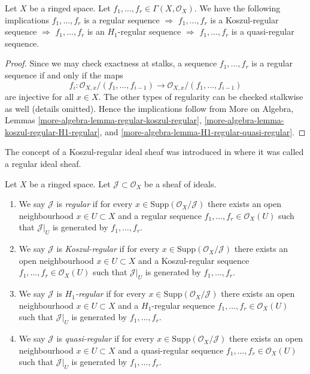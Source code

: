 \begin{lemma}
\label{lemma-types-regular-sequences-implications}
Let $X$ be a ringed space.
Let $f_1, \ldots, f_r \in \Gamma(X, \mathcal{O}_X)$.
We have the following implications
$f_1, \ldots, f_r$ is a regular sequence $\Rightarrow$
$f_1, \ldots, f_r$ is a Koszul-regular sequence $\Rightarrow$
$f_1, \ldots, f_r$ is an $H_1$-regular sequence $\Rightarrow$
$f_1, \ldots, f_r$ is a quasi-regular sequence.
\end{lemma}

\begin{proof}
Since we may check exactness at stalks, a
sequence $f_1, \ldots, f_r$ is a regular sequence if and only
if the maps
$$
f_i :
\mathcal{O}_{X, x}/(f_1, \ldots, f_{i - 1})
\longrightarrow
\mathcal{O}_{X, x}/(f_1, \ldots, f_{i - 1})
$$
are injective for all $x \in X$. The other types of regularity
can be checked stalkwise as well (details omitted).
Hence the implications follow from More on Algebra, Lemmas
\ref{more-algebra-lemma-regular-koszul-regular},
\ref{more-algebra-lemma-koszul-regular-H1-regular}, and
\ref{more-algebra-lemma-H1-regular-quasi-regular}.
\end{proof}

\begin{definition}
\label{definition-regular-ideal-sheaf}
\begin{reference}
The concept of a Koszul-regular ideal sheaf was introduced in
\cite[Expose VII, Definition 1.4]{SGA6} where it was called a
regular ideal sheaf.
\end{reference}
Let $X$ be a ringed space. Let $\mathcal{J} \subset \mathcal{O}_X$
be a sheaf of ideals.
\begin{enumerate}
\item We say $\mathcal{J}$ is {\it regular} if for every
$x \in \text{Supp}(\mathcal{O}_X/\mathcal{J})$ there exists an open
neighbourhood $x \in U \subset X$ and a regular sequence
$f_1, \ldots, f_r \in \mathcal{O}_X(U)$ such that $\mathcal{J}|_U$
is generated by $f_1, \ldots, f_r$.
\item We say $\mathcal{J}$ is {\it Koszul-regular} if for every
$x \in \text{Supp}(\mathcal{O}_X/\mathcal{J})$ there exists an open
neighbourhood $x \in U \subset X$ and a Koszul-regular sequence
$f_1, \ldots, f_r \in \mathcal{O}_X(U)$ such that $\mathcal{J}|_U$
is generated by $f_1, \ldots, f_r$.
\item We say $\mathcal{J}$ is {\it $H_1$-regular} if for every
$x \in \text{Supp}(\mathcal{O}_X/\mathcal{J})$ there exists an open
neighbourhood $x \in U \subset X$ and a $H_1$-regular sequence
$f_1, \ldots, f_r \in \mathcal{O}_X(U)$ such that $\mathcal{J}|_U$
is generated by $f_1, \ldots, f_r$.
\item We say $\mathcal{J}$ is {\it quasi-regular} if for every
$x \in \text{Supp}(\mathcal{O}_X/\mathcal{J})$ there exists an open
neighbourhood $x \in U \subset X$ and a quasi-regular sequence
$f_1, \ldots, f_r \in \mathcal{O}_X(U)$ such that $\mathcal{J}|_U$
is generated by $f_1, \ldots, f_r$.
\end{enumerate}
\end{definition}

